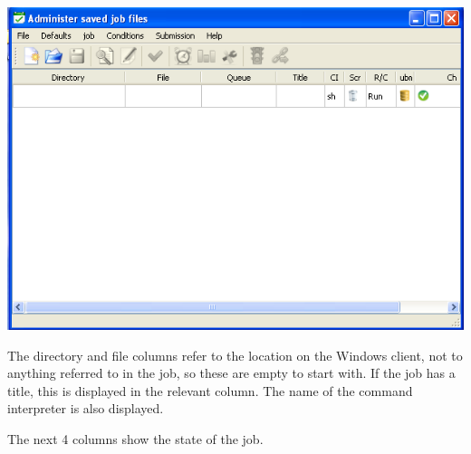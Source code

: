 \includegraphics{img/btrwnewjob1.png}

The directory and file columns refer to the location on the Windows client, not to anything
referred to in the job, so these are empty to start with. If the job has a title, this is displayed
in the relevant column. The name of the command interpreter is also displayed.

The next 4 columns show the state of the job.

